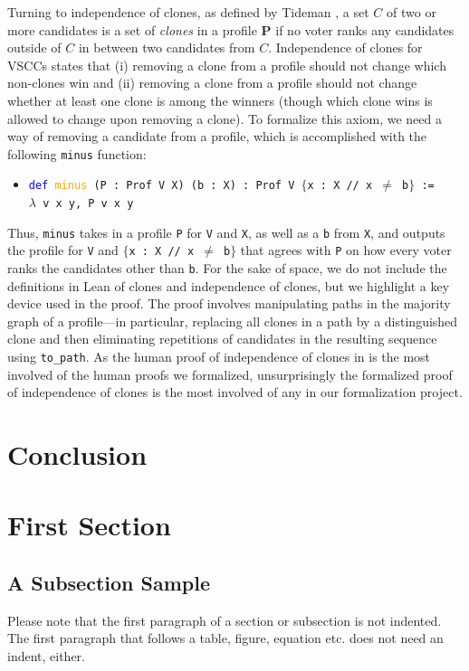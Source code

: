 \documentclass[runningheads]{llncs}
\begin{document}
Turning to independence of clones, as defined by Tideman \cite{Tideman1987}, a set $C$ of two or more candidates is a set of \textit{clones} in a profile $\mathbf{P}$ if no voter ranks any candidates outside of $C$ in between two candidates from $C$. Independence of clones for VSCCs states that (i) removing a clone from a profile should not change which non-clones win and (ii) removing a clone from a profile should not change whether at least one clone is among the winners (though which clone wins is allowed to change upon removing a clone). To formalize this axiom, we need a way of removing a candidate from a profile, which is accomplished with the following \texttt{minus} function:
\begin{itemize}
\item[] \texttt{\textcolor{blue}{def} \textcolor{orange}{minus} (P : Prof V X) (b : X) : Prof V $\{$x : X // x $\neq$ b$\}$ :=} \\
\texttt{$\lambda$ v x y, P v x y}
\end{itemize}
Thus, \texttt{minus} takes in a profile \texttt{P} for \texttt{V} and \texttt{X}, as well as a \texttt{b} from \texttt{X}, and outputs the profile for \texttt{V} and \texttt{$\{$x : X // x $\neq$ b$\}$} that agrees with \texttt{P} on how every voter ranks the candidates other than \texttt{b}. For the sake of space, we do not include the definitions in Lean of clones and independence of clones, but we highlight a key device used in the proof. The proof involves manipulating paths in the majority graph of a profile---in particular, replacing all clones in a path by a distinguished clone and then eliminating repetitions of candidates in the resulting sequence using \texttt{to\_path}. As the human proof of independence of clones in \cite{HP2020} is the most involved of the human proofs we formalized, unsurprisingly the formalized proof of independence of clones is the most involved of any in our formalization project. 


\section{Conclusion}\label{Conclusion}




\newpage

\section{First Section}
\subsection{A Subsection Sample}
Please note that the first paragraph of a section or subsection is
not indented. The first paragraph that follows a table, figure,
equation etc. does not need an indent, either.
\end{document}
